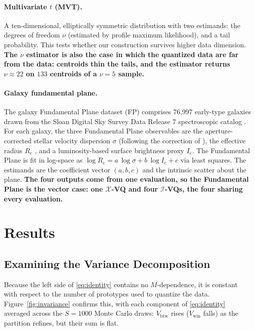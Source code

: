 \documentclass[runningheads]{llncs}
\newif\ifrev \revtrue
\newcommand{\rev}[1]{\ifrev{\color{blue}\bfseries #1}\else#1\fi}
\newcommand{\Vcell}{V_{\mathrm{btw}}}
\newcommand{\Vwithin}{V_{\mathrm{win}}}
\newcommand{\XVQ}{\ensuremath{\mathcal{X}}-VQ}
\newcommand{\IVQ}{\ensuremath{\mathcal{I}}-VQ}
\begin{document}
\paragraph{Multivariate $t$ (MVT).} A ten-dimensional, elliptically symmetric distribution with two estimands: the degrees of freedom $\nu$ (estimated by profile maximum likelihood), and a tail probability. This tests whether our construction survives higher data dimension. \rev{The $\nu$ estimator is also the case in which the quantized data are far from the data: centroids thin the tails, and the estimator returns $\nu \approx 22$ on $133$ centroids of a $\nu = 5$ sample.}

\paragraph{Galaxy fundamental plane.} The galaxy Fundamental Plane dataset (FP) comprises 76{,}997 early-type galaxies drawn from the Sloan Digital Sky Survey Data Release 7 spectroscopic catalog \cite{abazajian2009}. 
For each galaxy, the three Fundamental Plane observables are the aperture-corrected stellar velocity dispersion $\sigma$ (following the correction of \cite{jorgensen1995}), the 
effective radius $R_e$ 
, and a luminosity-based surface brightness proxy $I_e$.
The Fundamental Plane is fit in log-space as $\log R_e = a\,\log\sigma + b\,\log I_e + c$ via least squares. The estimands are the coefficient vector $(a,b,c)$ and the intrinsic scatter about the plane. \rev{The four outputs come from one evaluation, so the Fundamental Plane is the vector case: one \XVQ{} and four \IVQ{}s, the four sharing every evaluation.}


\section{Results}\label{sec:results}

\subsection{Examining the Variance Decomposition}\label{sec:res-valid}

Because the left side of \eqref{eq:identity} contains no $M$-dependence, it is  constant with respect to the number of prototypes used to quantize the data. Figure~\ref{fig:invariance} confirms this, with each component of \eqref{eq:identity} averaged across the $S = 1000$ Monte Carlo draws: $\Vcell$ rises ($\Vwithin$ falls) as the partition refines, but their sum is flat. %
\end{document}
